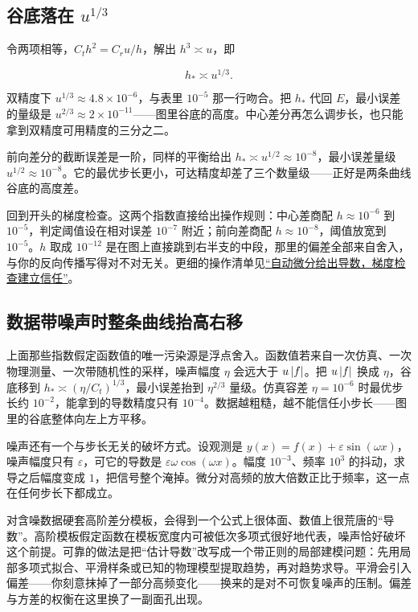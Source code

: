 \subsection{谷底落在 \(u^{1/3}\)}

令两项相等，\(C_th^2=C_ru/h\)，解出 \(h^3\asymp u\)，即

\[
h_\ast\asymp u^{1/3}.
\]

双精度下 \(u^{1/3}\approx4.8\times10^{-6}\)，与表里 \(10^{-5}\) 那一行吻合。把 \(h_\ast\) 代回 \(E\)，最小误差的量级是 \(u^{2/3}\approx2\times10^{-11}\)——图里谷底的高度。中心差分再怎么调步长，也只能拿到双精度可用精度的三分之二。

前向差分的截断误差是一阶，同样的平衡给出 \(h_\ast\asymp u^{1/2}\approx10^{-8}\)，最小误差量级 \(u^{1/2}\approx10^{-8}\)。它的最优步长更小，可达精度却差了三个数量级——正好是两条曲线谷底的高度差。

回到开头的梯度检查。这两个指数直接给出操作规则：中心差商配 \(h\approx10^{-6}\) 到 \(10^{-5}\)，判定阈值设在相对误差 \(10^{-7}\) 附近；前向差商配 \(h\approx10^{-8}\)，阈值放宽到 \(10^{-5}\)。\(h\) 取成 \(10^{-12}\) 是在图上直接跳到右半支的中段，那里的偏差全部来自舍入，与你的反向传播写得对不对无关。更细的操作清单见\hyperref[sec:08-Numerical-Analysis/07-Numerical-Methods-for-ML/02]{``自动微分给出导数，梯度检查建立信任''}。

\subsection{数据带噪声时整条曲线抬高右移}

上面那些指数假定函数值的唯一污染源是浮点舍入。函数值若来自一次仿真、一次物理测量、一次带随机性的采样，噪声幅度 \(\eta\) 会远大于 \(u\left|f\right|\)。把 \(u\left|f\right|\) 换成 \(\eta\)，谷底移到 \(h_\ast\asymp(\eta/C_t)^{1/3}\)，最小误差抬到 \(\eta^{2/3}\) 量级。仿真容差 \(\eta=10^{-6}\) 时最优步长约 \(10^{-2}\)，能拿到的导数精度只有 \(10^{-4}\)。数据越粗糙，越不能信任小步长——图里的谷底整体向左上方平移。

噪声还有一个与步长无关的破坏方式。设观测是 \(y(x)=f(x)+\varepsilon\sin(\omega x)\)，噪声幅度只有 \(\varepsilon\)，可它的导数是 \(\varepsilon\omega\cos(\omega x)\)。幅度 \(10^{-3}\)、频率 \(10^3\) 的抖动，求导之后幅度变成 \(1\)，把信号整个淹掉。微分对高频的放大倍数正比于频率，这一点在任何步长下都成立。

对含噪数据硬套高阶差分模板，会得到一个公式上很体面、数值上很荒唐的``导数''。高阶模板假定函数在模板宽度内可被低次多项式很好地代表，噪声恰好破坏这个前提。可靠的做法是把``估计导数''改写成一个带正则的局部建模问题：先用局部多项式拟合、平滑样条或已知的物理模型提取趋势，再对趋势求导。平滑会引入偏差——你刻意抹掉了一部分高频变化——换来的是对不可恢复噪声的压制。偏差与方差的权衡在这里换了一副面孔出现。

